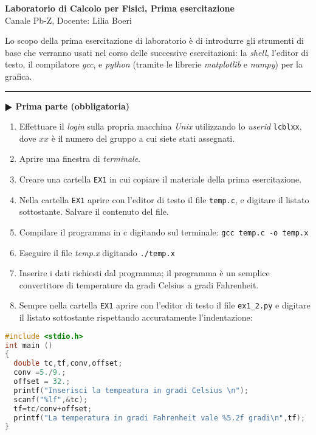 \documentclass[11pt]{article}
\begin{document}
\pagestyle{empty}

\begin{center}
{\Large \bf  Laboratorio di Calcolo per Fisici, Prima esercitazione\\[2mm]}
{\large Canale Pb-Z, Docente: Lilia Boeri}
\end{center}
\vspace{4mm}

\begin{mdframed}[backgroundcolor=panna]
  Lo scopo della prima esercitazione di laboratorio \`e di introdurre gli strumenti di base che verranno usati nel corso delle successive esercitazioni:
  la {\em shell}, l'editor di testo, il compilatore {\em gcc}, e {\em python\/} (tramite le librerie
  {\em matplotlib\/} e {\em numpy\/}) per la grafica.
\\
\end{mdframed}
%
%

\hrule
\vspace{2mm}
\textbf{$\RHD$ Prima parte (obbligatoria)} 
\begin{enumerate}
\item Effettuare il {\em login\/} sulla propria macchina {\em Unix\/} utilizzando lo {\em userid\/} \texttt{lcblxx}, 
dove $xx$ \`e il numero del gruppo a cui siete stati assegnati.
\item Aprire una finestra di {\em terminale}.
\item Creare una cartella  \texttt{EX1} in cui copiare il materiale della prima esercitazione.
\item Nella cartella \texttt{EX1} aprire con l'editor di testo il file \texttt{temp.c}, e digitare il listato sottostante. Salvare il contenuto del file.

\item Compilare il programma in c digitando sul terminale:
  \texttt{gcc temp.c -o temp.x}
\item Eseguire il file {\em temp.x\/} digitando \texttt{./temp.x}
\item Inserire i dati richiesti dal programma; il programma \`e un semplice convertitore di temperature da gradi Celsius a gradi Fahrenheit.
\item Sempre nella cartella \texttt{EX1} aprire con l'editor di testo il file \texttt{ex1\_2.py} e digitare il listato
  sottostante rispettando accuratamente l'indentazione:
\end{enumerate}
\begin{lstlisting}[caption={Programma \texttt{temp.c}},language=c]
#include <stdio.h>
int main ()
{
  double tc,tf,conv,offset;
  conv =5./9.;
  offset = 32.;
  printf("Inserisci la tempeatura in gradi Celsius \n");
  scanf("%lf",&tc);
  tf=tc/conv+offset;
  printf("La temperatura in gradi Fahrenheit vale %5.2f gradi\n",tf);
}
\end{lstlisting}
\end{document}
